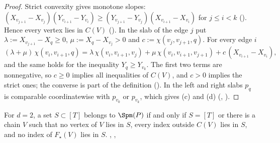 \begin{proof}
Strict convexity gives monotone slopes: $(X_{v_{j+1}}-X_{v_j})(Y_{v_{i+1}}-Y_{v_i})\ge(Y_{v_{j+1}}-Y_{v_j})(X_{v_{i+1}}-X_{v_i})$ for $j\le i<k$ (). Hence every vertex lies in $C(V)$ (). In the slab of the edge $j$ put $\lambda:=X_{v_{j+1}}-X_q\ge0$, $\mu:=X_q-X_{v_j}>0$ and $c:=\chi(v_j,v_{j+1},q)$. For every edge $i$
\[
(\lambda+\mu)\,\chi(v_i,v_{i+1},q)=\lambda\,\chi(v_i,v_{i+1},v_j)+\mu\,\chi(v_i,v_{i+1},v_{j+1})+c\,(X_{v_{i+1}}-X_{v_i}),
\]
and the same holds for the inequality $Y_q\ge Y_{v_k}$. The first two terms are nonnegative, so $c\ge0$ implies all inequalities of $C(V)$, and $c>0$ implies the strict ones; the converse is part of the definition (). In the left and right slabs $p_q$ is comparable coordinatewise with $p_{v_0}$ or $p_{v_k}$, which gives (c) and (d) (, ).
\end{proof}

\begin{theorem}[chains]\label{thm:chain}
For $d=2$, a set $S\subset[T]$ belongs to $\Spm(P)$ if and only if $S=[T]$ or there is a chain $V$ such that no vertex of $V$ lies in $S$, every index outside $C(V)$ lies in $S$, and no index of $F_\star(V)$ lies in $S$. \hfill{}, , 
\end{theorem}

